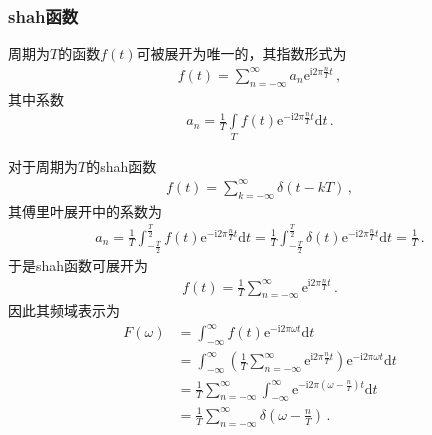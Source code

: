 \subsubsection*{shah函数}
\begin{theorem}
    周期为$T$的函数$f(t)$可被展开为唯一的，其指数形式为
    \begin{align}
        f(t)=\sum\limits_{n=-\infty}^{\infty}a_n\mathrm{e}^{\mathrm{i}2\pi\frac{n}{T}t}\, ,
    \end{align}
    其中系数
    \begin{align}
        a_n=\frac{1}{T}\int\limits_T f(t)\mathrm{e}^{-\mathrm{i}2\pi\frac{n}{T}t}\mathrm{d}t\, .
    \end{align}
\end{theorem}

对于周期为$T$的shah函数
\begin{align}
    f(t)=\sum\limits_{k=-\infty}^{\infty}\delta(t-kT)\, ,
\end{align}
其傅里叶展开中的系数为
\begin{align}
    a_n=\frac{1}{T}\int_{-\frac{T}{2}}^{\frac{T}{2}}f(t)\mathrm{e}^{-\mathrm{i}2\pi\frac{n}{T}t}\mathrm{d}t
    =\frac{1}{T}\int_{-\frac{T}{2}}^{\frac{T}{2}}\delta(t)\mathrm{e}^{-\mathrm{i}2\pi\frac{n}{T}t}\mathrm{d}t
    =\frac{1}{T}\, .
\end{align}
于是shah函数可展开为
\begin{align}
    f(t)=\frac{1}{T}\sum\limits_{n=-\infty}^{\infty}\mathrm{e}^{\mathrm{i}2\pi\frac{n}{T}t}\, .
\end{align}
因此其频域表示为
\begin{align}
    F(\omega) & =\int_{-\infty}^{\infty}f(t)\mathrm{e}^{-\mathrm{i}2\pi\omega t}\mathrm{d}t\nonumber                                                                                            \\
              & =\int_{-\infty}^{\infty}\left(\frac{1}{T}\sum\limits_{n=-\infty}^{\infty}\mathrm{e}^{\mathrm{i}2\pi\frac{n}{T}t}\right)\mathrm{e}^{-\mathrm{i}2\pi\omega t}\mathrm{d}t\nonumber \\
              & =\frac{1}{T}\sum\limits_{n=-\infty}^{\infty}\int_{-\infty}^{\infty}\mathrm{e}^{-\mathrm{i}2\pi(\omega-\frac{n}{T})t}\mathrm{d}t\nonumber                                        \\
              & =\frac{1}{T}\sum\limits_{n=-\infty}^{\infty}\delta\left(\omega-\frac{n}{T}\right)\, .
\end{align}